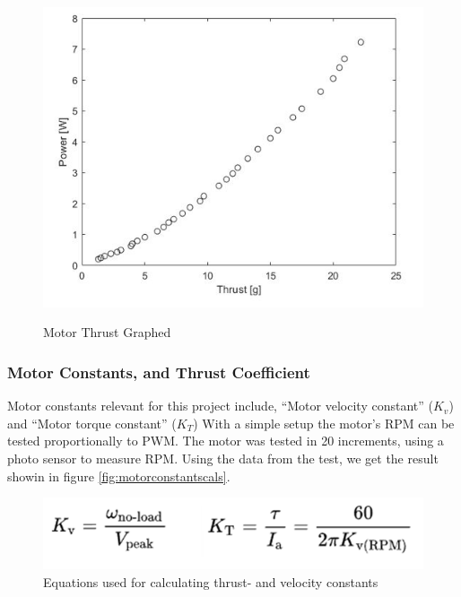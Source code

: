 \begin{figure}[H]
\begin{center}
   \includegraphics[scale =1]{pictures/control/Graph thrust.JPG}
   \label{motorthrustgraphed}
\end{center}
\caption{Motor Thrust Graphed}
\end{figure}

\subsubsection{Motor Constants, and Thrust Coefficient}
Motor constants relevant for this project include, “Motor velocity constant” ($K_v$) and “Motor torque constant” ($K_T$)
With a simple setup the motor's RPM can be tested proportionally to PWM. The motor was tested in 20 increments, using a photo sensor to measure RPM. Using the data from the test, we get the result showin in figure \ref{fig:motorconstantscals}. \cite{MotorConstants}

\begin{figure}[H]
\begin{center}
   \includegraphics[scale =1]{pictures/control/Motor constants theory.png}
\end{center}
\caption{Equations used for calculating thrust- and velocity constants}
\end{figure}

